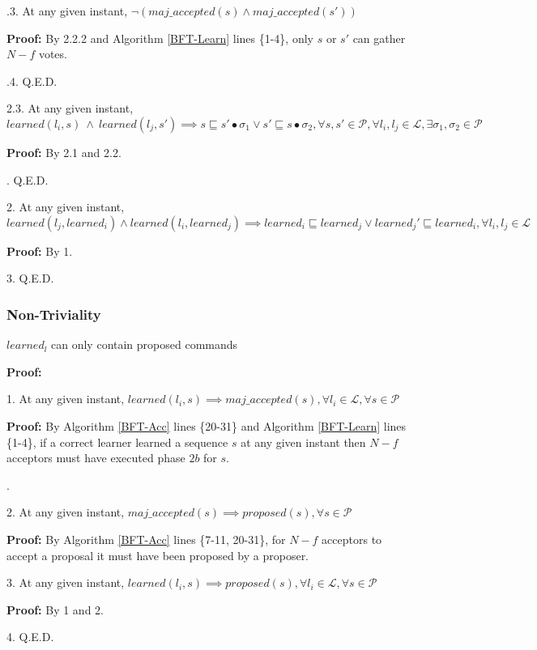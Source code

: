 \indent\indent\indent\indent{}.3. At any given instant, $\neg (maj\_accepted(s) \land maj\_accepted(s'))$ \par
\indent\indent\indent\indent\indent\indent \parbox{\linewidth}{\textbf{Proof:} By 2.2.2 and Algorithm \ref{BFT-Learn} lines \{1-4\}, only $s$ or $s'$ can gather $N-f$ votes.}\par
\indent\indent\indent\indent{}.4. Q.E.D. \par
\indent\indent\indent \parbox{\linewidth}{2.3. At any given instant, $learned(l_i,s)\ \land\ learned(l_j,s') \implies s \sqsubseteq s' \bullet \sigma_1 \lor s' \sqsubseteq s \bullet \sigma_2, \forall s,s' \in \mathcal{P}, \forall l_i,l_j \in \mathcal{L}, \exists \sigma_1,\sigma_2 \in \mathcal{P}$ }\par
\indent\indent\indent\indent\textbf{Proof:} By 2.1 and 2.2.\par
\indent\indent{}. Q.E.D. \par
\parbox{\linewidth}{2. At any given instant, $learned(l_j,learned_i) \land learned(l_i,learned_j) \implies learned_i \sqsubseteq learned_j \lor learned_j' \sqsubseteq learned_i, \forall l_i,l_j \in \mathcal{L}$}\par
\indent\indent\textbf{Proof:} By 1.\par
3. Q.E.D. \par

\subsubsection{Non-Triviality}
\begin{theorem}
$learned_l$ can only contain proposed commands \label{N-T1} \par
\end{theorem} 
\textbf{Proof:} \par
1. At any given instant, $learned(l_i,s) \implies maj\_accepted(s),\forall l_i \in \mathcal{L}, \forall s \in \mathcal{P}$ \par
\indent\indent\parbox{\linewidth}{\textbf{Proof:} By Algorithm \ref{BFT-Acc} lines \{20-31\} and Algorithm \ref{BFT-Learn} lines \{1-4\}, if a correct learner learned a sequence $s$ at any given instant then $N-f$ acceptors must have executed phase $2b$ for $s$.}. \par
2. At any given instant, $maj\_accepted(s) \implies proposed(s), \forall s \in \mathcal{P}$ \par
\indent\indent\textbf{Proof:} By Algorithm \ref{BFT-Acc} lines \{7-11, 20-31\}, for $N-f$ acceptors to accept a proposal it must have been proposed by a proposer.\par
3. At any given instant, $learned(l_i,s) \implies proposed(s),\forall l_i \in \mathcal{L}, \forall s \in \mathcal{P}$ \par
\indent\indent\textbf{Proof:} By 1 and 2. \par
4. Q.E.D. \par

